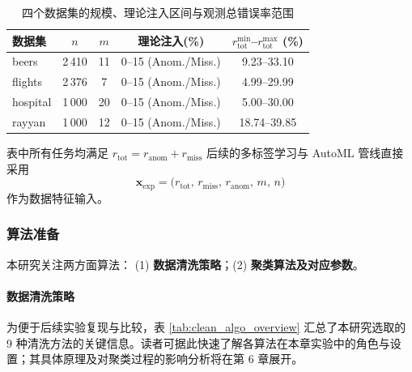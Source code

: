 \documentclass[10pt]{article} %
\numberwithin{equation}{section}
\begin{document}
\begin{table}[htbp]
  \centering
  \setlength{\tabcolsep}{5pt}
  \begin{tabular}{lcccc}
    \toprule
    \textbf{数据集} & $n$ & $m$ & \textbf{理论注入(\%)} & $r_{\text{tot}}^{\min}$--$r_{\text{tot}}^{\max}$ (\%)\\
    \midrule
    beers    & 2\,410 & 11 & 0--15 (Anom./Miss.) & 9.23--33.10 \\
    flights  & 2\,376 & 7  & 0--15 (Anom./Miss.) & 4.99--29.99 \\
    hospital & 1\,000 & 20 & 0--15 (Anom./Miss.) & 5.00--30.00 \\
    rayyan   & 1\,000 & 12 & 0--15 (Anom./Miss.) & 18.74--39.85 \\
    \bottomrule
  \end{tabular}
  \caption{四个数据集的规模、理论注入区间与观测总错误率范围}
  \label{tab:dataset_overview}
\end{table}

\noindent
\textcolor[rgb]{0.00,0.07,1.00}{表中所有任务均满足 \(r_{\text{tot}} = r_{\text{anom}} + r_{\text{miss}}\)
后续的多标签学习与 AutoML 管线直接采用
\[
  \mathbf{x}_{\text{exp}}
  = \bigl(r_{\text{tot}},\,r_{\text{miss}},\,r_{\text{anom}},\,m,\,n\bigr)
\]
作为数据特征输入。}


\subsubsection{算法准备}
\label{sec:algo_prep}

本研究关注两方面算法：
(1) \textbf{数据清洗策略}；(2) \textbf{聚类算法及对应参数}。

\paragraph{数据清洗策略}   
\textcolor[rgb]{0.00,0.07,1.00}{为便于后续实验复现与比较，表 \ref{tab:clean_algo_overview} 汇总了本研究选取的 9 种清洗方法的关键信息。读者可据此快速了解各算法在本章实验中的角色与设置；其具体原理及对聚类过程的影响分析将在第 6 章展开。}
\end{document}
